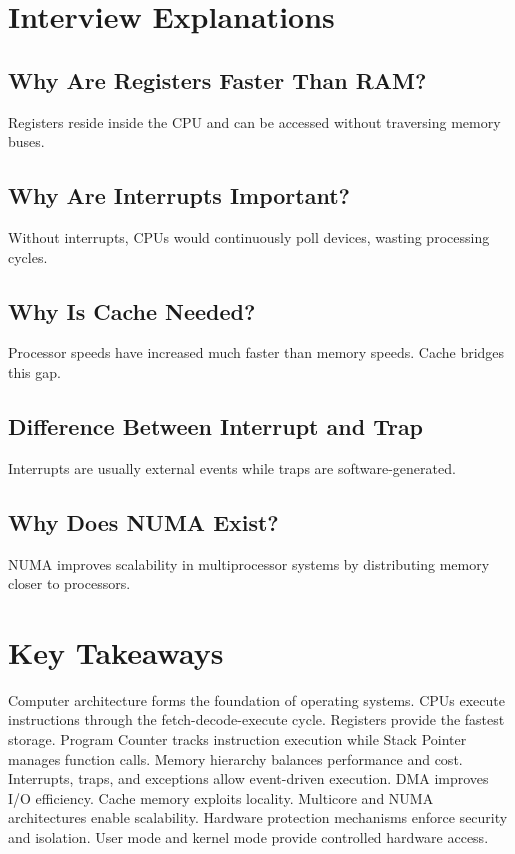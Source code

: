 \section{Interview Explanations}

\subsection{Why Are Registers Faster Than RAM?}

Registers reside inside the CPU and can be accessed without traversing memory buses.

\subsection{Why Are Interrupts Important?}

Without interrupts, CPUs would continuously poll devices, wasting processing cycles.

\subsection{Why Is Cache Needed?}

Processor speeds have increased much faster than memory speeds. Cache bridges this gap.

\subsection{Difference Between Interrupt and Trap}

Interrupts are usually external events while traps are software-generated.

\subsection{Why Does NUMA Exist?}

NUMA improves scalability in multiprocessor systems by distributing memory closer to processors.

\section{Key Takeaways}

\begin{keytakeaways}
Computer architecture forms the foundation of operating systems. CPUs execute instructions through the fetch-decode-execute cycle. Registers provide the fastest storage. Program Counter tracks instruction execution while Stack Pointer manages function calls. Memory hierarchy balances performance and cost. Interrupts, traps, and exceptions allow event-driven execution. DMA improves I/O efficiency. Cache memory exploits locality. Multicore and NUMA architectures enable scalability. Hardware protection mechanisms enforce security and isolation. User mode and kernel mode provide controlled hardware access.
\end{keytakeaways}

